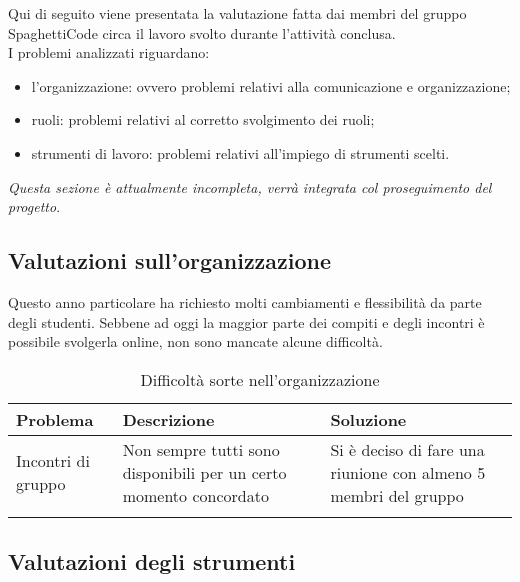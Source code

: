 \documentclass[../piano_di_qualifica.tex]{subfiles}
\begin{document}
Qui di seguito viene presentata la valutazione fatta dai membri del gruppo SpaghettiCode circa il lavoro svolto durante l'attività conclusa.\\
I problemi analizzati riguardano:
\begin{itemize}
	\item l'organizzazione: ovvero problemi relativi alla comunicazione e organizzazione;
	\item ruoli: problemi relativi al corretto svolgimento dei ruoli;
	\item strumenti di lavoro: problemi relativi all'impiego di strumenti scelti.
\end{itemize}
\emph{Questa sezione è attualmente incompleta, verrà integrata col proseguimento del progetto}.

\subsection{Valutazioni sull'organizzazione}
\label{sub:valut_org}
Questo anno particolare ha richiesto molti cambiamenti e flessibilità da parte degli studenti. Sebbene ad oggi la maggior parte dei compiti e
degli incontri è possibile svolgerla online, non sono mancate alcune difficoltà.

\begin{center}
	\begin{longtable}{|l|p{6cm}|p{6cm}|}
		\hline
		\rowcolor{lightgray}
		{\textbf{Problema}} & {\textbf{Descrizione}} & {\textbf{Soluzione}} \\
		\hline
		Incontri di gruppo & Non sempre tutti sono disponibili per un certo momento concordato &
		Si è deciso di fare una riunione con almeno 5 membri del gruppo \\
		\hline
		\rowcolor{white}
		\caption{Difficoltà sorte nell'organizzazione}
	\end{longtable}
\end{center}


\subsection{Valutazioni degli strumenti}
\label{sub:valut_strumenti}
\end{document}
